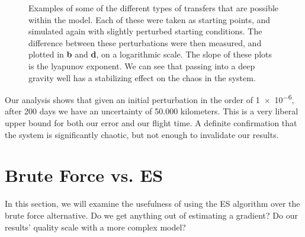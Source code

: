 \begin{figure}
{        \label{fig:long_leto_slope}
    }
    \caption{Examples of some of the different types of transfers that are possible within the model. Each of these were taken as starting points, and simulated again with slightly perturbed starting conditions. The difference between these perturbations were then measured, and plotted in \textbf{b} and \textbf{d}, on a logarithmic scale. The slope of these plots is the lyapunov exponent. We can see that passing into a deep gravity well has a stabilizing effect on the chaos in the system.}
    \label{fig:lyapunov}
\end{figure} 

Our analysis shows that given an initial perturbation in the order of \num{1e-6}, after 200 days we have an uncertainty of 50.000 kilometers. This is a very liberal upper bound for both our error and our flight time. A definite confirmation that the system is significantly chaotic, but not enough to invalidate our results. 




\section{Brute Force vs. ES}
In this section, we will examine the usefulness of using the ES algorithm over the brute force alternative. Do we get anything out of estimating a gradient? Do our results’ quality scale with a more complex model?

